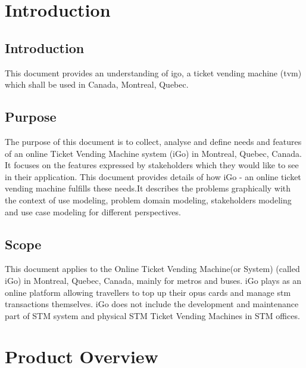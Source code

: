 \documentclass[11pt, english]{report}
\begin{document}
\newcommand{\CC}{C\nolinebreak\hspace{-.05em}\raisebox{.4ex}{\tiny\bf +}\nolinebreak\hspace{-.10em}\raisebox{.4ex}{\tiny\bf +}}
\def\CC{{C\nolinebreak[4]\hspace{-.05em}\raisebox{.4ex}{\tiny\bf ++}}}

\tableofcontents
\newpage

\chapter{Introduction}
\section{Introduction}
This document provides an understanding of \gls{igo}, a ticket vending machine (\gls{tvm}) which shall be used in Canada, Montreal, Quebec. 


\section{Purpose}
The purpose of this document is to collect, analyse and define needs and features of an online Ticket Vending Machine system (iGo) in Montreal, Quebec, Canada. It focuses on the features expressed by stakeholders which they would like to see in their application. This document provides details of how iGo - an online ticket vending machine fulfills these needs.It  describes the problems graphically with the context of use modeling, problem domain modeling, stakeholders modeling and use case modeling for different perspectives.
\section{Scope}
This document applies to the Online Ticket Vending Machine(or System) (called iGo)  in Montreal, Quebec, Canada, mainly for metros and buses. iGo plays as an online platform  allowing  travellers  to top up their \gls{opus} cards and manage \gls{stm} transactions themselves. iGo does not include the development and maintenance part of STM system and physical STM Ticket Vending Machines in STM offices.



\chapter{Product Overview}
\end{document}
